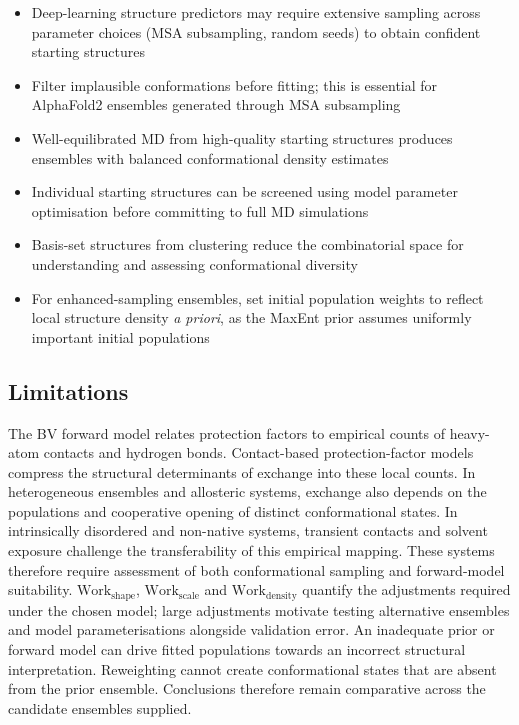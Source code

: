 \begin{itemize}
    \item Deep-learning structure predictors may require extensive sampling across parameter choices (MSA subsampling, random seeds) to obtain confident starting structures
    \item Filter implausible conformations before fitting; this is essential for AlphaFold2 ensembles generated through MSA subsampling
    \item Well-equilibrated MD from high-quality starting structures produces ensembles with balanced conformational density estimates
    \item Individual starting structures can be screened using model parameter optimisation before committing to full MD simulations
    \item Basis-set structures from clustering reduce the combinatorial space for understanding and assessing conformational diversity
    \item For enhanced-sampling ensembles, set initial population weights to reflect local structure density \textit{a priori}, as the MaxEnt prior assumes uniformly important initial populations
\end{itemize}

\subsection{Limitations}
\label{sec:valdx-limitations}

The BV forward model relates protection factors to empirical counts of heavy-atom contacts and hydrogen bonds.\supercite{bestStructuralInterpretationHydrogen2006} Contact-based protection-factor models compress the structural determinants of exchange into these local counts. In heterogeneous ensembles and allosteric systems, exchange also depends on the populations and cooperative opening of distinct conformational states. In intrinsically disordered and non-native systems, transient contacts and solvent exposure challenge the transferability of this empirical mapping. These systems therefore require assessment of both conformational sampling and forward-model suitability. $\text{Work}_\text{shape}$, $\text{Work}_\text{scale}$ and $\text{Work}_\text{density}$ quantify the adjustments required under the chosen model; large adjustments motivate testing alternative ensembles and model parameterisations alongside validation error. An inadequate prior or forward model can drive fitted populations towards an incorrect structural interpretation. Reweighting cannot create conformational states that are absent from the prior ensemble. Conclusions therefore remain comparative across the candidate ensembles supplied.

